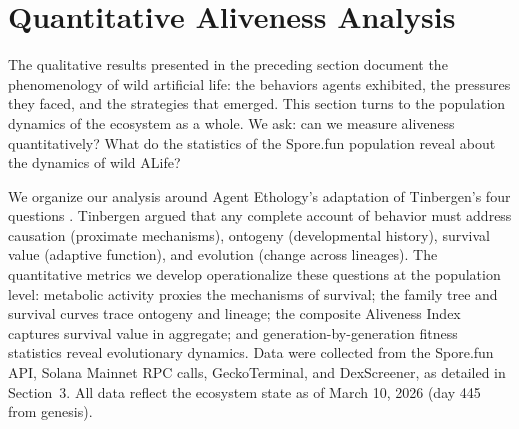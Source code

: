 %

\section{Quantitative Aliveness Analysis}
\label{sec:quantitative}

The qualitative results presented in the preceding section document the phenomenology of wild artificial life: the behaviors agents exhibited, the pressures they faced, and the strategies that emerged. This section turns to the population dynamics of the ecosystem as a whole. We ask: can we measure aliveness quantitatively? What do the statistics of the Spore.fun population reveal about the dynamics of wild ALife?

We organize our analysis around Agent Ethology's adaptation of Tinbergen's four questions \cite{Tinbergen1963,Hu2025AgentEthology}. Tinbergen argued that any complete account of behavior must address causation (proximate mechanisms), ontogeny (developmental history), survival value (adaptive function), and evolution (change across lineages). The quantitative metrics we develop operationalize these questions at the population level: metabolic activity proxies the mechanisms of survival; the family tree and survival curves trace ontogeny and lineage; the composite Aliveness Index captures survival value in aggregate; and generation-by-generation fitness statistics reveal evolutionary dynamics. Data were collected from the Spore.fun API, Solana Mainnet RPC calls, GeckoTerminal, and DexScreener, as detailed in Section~3. All data reflect the ecosystem state as of March 10, 2026 (day 445 from genesis).

